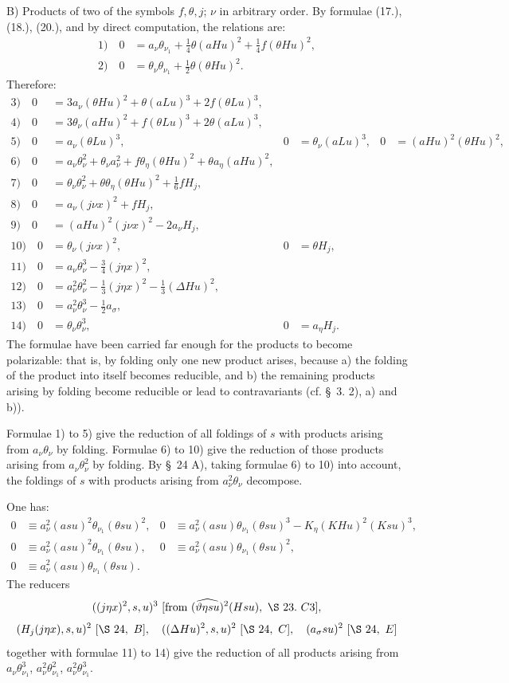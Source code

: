 \documentclass[11pt]{article}
\newcommand{\D}{\Delta}
\begin{document}
B) Products of two of the symbols $f,\theta,j$; $\nu$ in arbitrary order. By formulae (17.), (18.), (20.), and by direct computation, the relations are:
\begin{align*}
1)\quad 0&=a_\nu\theta_{\nu_1}+\frac14\theta(aHu)^2+\frac14f(\theta Hu)^2,\\
2)\quad 0&=\theta_\nu\theta_{\nu_1}+\frac12\theta(\theta Hu)^2.
\end{align*}
Therefore:
\begin{align*}
3)\quad 0&=3a_\nu(\theta Hu)^2+\theta(aLu)^3+2f(\theta Lu)^3,\\
4)\quad 0&=3\theta_\nu(aHu)^2+f(\theta Lu)^3+2\theta(aLu)^3,\\
5)\quad 0&=a_\nu(\theta Lu)^3,
&0&=\theta_\nu(aLu)^3,
&0&=(aHu)^2(\theta Hu)^2,\\
6)\quad 0&=a_\nu\theta_\nu^2+\theta_\nu a_\nu^2+f\theta_\eta(\theta Hu)^2+\theta a_\eta(aHu)^2,\\
7)\quad 0&=\theta_\nu\theta_\nu^2+\theta\theta_\eta(\theta Hu)^2+\frac16fH_j,\\
8)\quad 0&=a_\nu(j\nu x)^2+fH_j,\\
9)\quad 0&=(aHu)^2(j\nu x)^2-2a_\nu H_j,\\
10)\quad 0&=\theta_\nu(j\nu x)^2,
&0&=\theta H_j,\\
11)\quad 0&=a_\nu\theta_\nu^3-\frac34(j\eta x)^2,\\
12)\quad 0&=a_\nu^2\theta_\nu^2-\frac13(j\eta x)^2-\frac13(\D Hu)^2,\\
13)\quad 0&=a_\nu^2\theta_\nu^3-\frac12a_\sigma,\\
14)\quad 0&=\theta_\nu\theta_\nu^3,
&0&=a_\eta H_j.
\end{align*}
The formulae have been carried far enough for the products to become polarizable: that is, by folding only one new product arises, because a) the folding of the product into itself becomes reducible, and b) the remaining products arising by folding become reducible or lead to contravariants (cf. \S\ 3. 2), a) and b)).

Formulae 1) to 5) give the reduction of all foldings of $s$ with products arising from $a_\nu\theta_\nu$ by folding. Formulae 6) to 10) give the reduction of those products arising from $a_\nu\theta_\nu^2$ by folding. By \S\ 24 A), taking formulae 6) to 10) into account, the foldings of $s$ with products arising from $a_\nu^2\theta_\nu$ decompose.

One has:
\begin{align*}
0&\equiv a_\nu^2(asu)^2\theta_{\nu_1}(\theta su)^2,
&0&\equiv a_\nu^2(asu)\theta_{\nu_1}(\theta su)^3-K_\eta(KHu)^2(Ksu)^3,\\
0&\equiv a_\nu^2(asu)^2\theta_{\nu_1}(\theta su),
&0&\equiv a_\nu^2(asu)\theta_{\nu_1}(\theta su)^2,\\
0&\equiv a_\nu^2(asu)\theta_{\nu_1}(\theta su).
\end{align*}
The reducers
\[
 ((j\eta x)^2,s,u)^3\ [\hbox{from }(\widehat{\vartheta\eta su})^2(Hsu),\ \S\ 23.\ C3],
\]
\[
(H_j(j\eta x),s,u)^2\ [\S\ 24,\ B],
\quad ((\D Hu)^2,s,u)^2\ [\S\ 24,\ C],
\quad (a_\sigma su)^2\ [\S\ 24,\ E]
\]
together with formulae 11) to 14) give the reduction of all products arising from $a_\nu\theta_{\nu_1}^3$, $a_\nu^2\theta_{\nu_1}^2$, $a_\nu^2\theta_{\nu_1}^3$.
\end{document}
